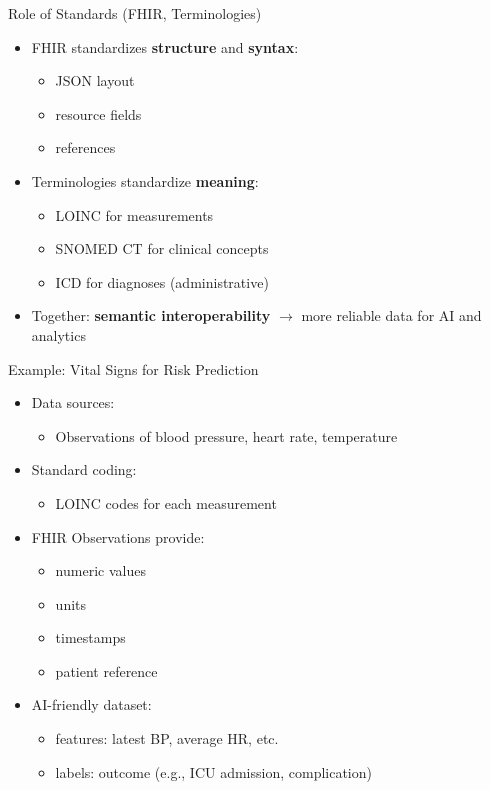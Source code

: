 \documentclass[aspectratio=1610]{beamer}
\begin{document}
	\begin{frame}{Role of Standards (FHIR, Terminologies)}
		\begin{itemize}
			\item FHIR standardizes \textbf{structure} and \textbf{syntax}:
			\begin{itemize}
				\item JSON layout
				\item resource fields
				\item references
			\end{itemize}
			\item Terminologies standardize \textbf{meaning}:
			\begin{itemize}
				\item LOINC for measurements
				\item SNOMED CT for clinical concepts
				\item ICD for diagnoses (administrative)
			\end{itemize}
			\item Together: \textbf{semantic interoperability} $\rightarrow$ more reliable data for AI and analytics
		\end{itemize}
	\end{frame}
	
	\begin{frame}{Example: Vital Signs for Risk Prediction}
		\begin{itemize}
			\item Data sources:
			\begin{itemize}
				\item Observations of blood pressure, heart rate, temperature
			\end{itemize}
			\item Standard coding:
			\begin{itemize}
				\item LOINC codes for each measurement
			\end{itemize}
			\item FHIR Observations provide:
			\begin{itemize}
				\item numeric values
				\item units
				\item timestamps
				\item patient reference
			\end{itemize}
			\item AI-friendly dataset:
			\begin{itemize}
				\item features: latest BP, average HR, etc.
				\item labels: outcome (e.g., ICU admission, complication)
			\end{itemize}
		\end{itemize}
	\end{frame}
	
\end{document}
